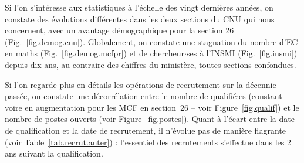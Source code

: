 Si l'on s'int\'eresse aux statistiques \`a l'\'echelle des vingt derni\`eres ann\'ees, on constate des \'evolutions
diff\'erentes dans les deux sections du CNU qui nous concernent, avec un avantage d\'emographique pour la section 26 (Fig.~\ref{fig.demog.cnu}).
Globalement, on constate une stagnation du nombre d'EC en maths (Fig.~\ref{fig.demog.mcfpr}) et de chercheur$\cdot$ses \`a l'INSMI 
(Fig.~\ref{fig.insmi}) depuis dix ans, au contraire des chiffres du minist\`ere, toutes sections
confondues.

Si l'on regarde plus en d\'etails les op\'erations de recrutement sur la d\'ecennie pass\'ee, on
constate une d\'ecorr\'elation entre le nombre de qualifi\'e$\cdot$es (constant voire en augmentation pour les MCF en section~26 
-- voir Figure~\ref{fig.qualif})
et le nombre de postes ouverts (voir Figure~\ref{fig.postes}). 
Quant \`a l'\'ecart entre la date de qualification et la date de recrutement, il n'\'evolue pas de mani\`ere flagrante
(voir Table~\ref{tab.recrut.anter}) : l'essentiel des recrutements s'effectue dans les 2 ans suivant la qualification.

